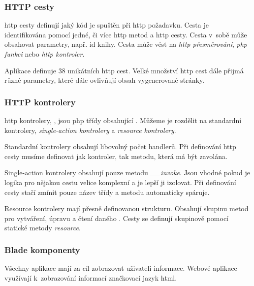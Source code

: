 \subsubsection{HTTP cesty}

\acrshort{http} cesty definují jaký kód je spuštěn při \acrshort{http} požadavku. Cesta je identifikována pomocí jedné, či více \acrshort{http} metod a \acrshort{http} cesty. Cesta v~sobě může obsahovat parametry, např. id knihy. Cesta může vést na \emph{\acrshort{http} přesměrování}, \emph{\acrshort{php} funkci} nebo \emph{\acrshort{http} kontroler}.

Aplikace \bso{} definuje 38 unikátních \acrshort{http} cest. Velké množství \acrshort{http} cest dále přijmá různé parametry, které dále ovlivňují obsah vygenerované stránky.

\subsubsection{HTTP kontrolery}

\acrshort{http} kontrolery, \inlaravel, jsou \acrshort{php} třídy obsahující . Můžeme je rozdělit na standardní kontrolery, \emph{single-action kontrolery}\cite{laravel-controller-single-action} a \emph{resource kontrolery}\cite{laravel-controller-resource}.

Standardní kontrolery obsahují libovolný počet handlerů. Při definování \acrshort{http} cesty musíme definovat jak kontroler, tak metodu, která má být zavolána.

Single-action kontrolery obsahují pouze metodu \emph{\_\_invoke}. Jsou vhodné pokud je logika pro nějakou cestu velice komplexní a je lepší ji izolovat. Při definování cesty stačí zmínit pouze název třídy a  metodu automaticky spáruje.

Resource kontrolery mají přesně definovanou strukturu. Obsahují skupinu metod pro vytváření, úpravu a čtení daného . Cesty se definují skupinově pomocí statické metody \emph{resource}.

\subsubsection{Blade komponenty}

Všechny aplikace mají za cíl zobrazovat uživateli informace. Webové aplikace využívají k~zobrazování informací značkovací jazyk \acrshort{html}.

